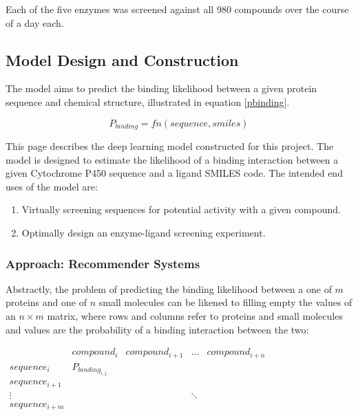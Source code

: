 \documentclass[16pt]{book}
\begin{document}
Each of the five enzymes was screened against all 980 compounds over the course of a day each.




\subsection{Model Design and Construction}

The model aims to predict the binding likelihood between a given protein sequence and chemical structure, illustrated in equation \ref{pbinding}.


\label{pbinding}
\begin{equation}
P_{binding} = fn(sequence, smiles)
\end{equation}


This page describes the deep learning model constructed for this project.
The model is designed to estimate the likelihood of a binding interaction between a given Cytochrome P450 sequence and a ligand SMILES code.
The intended end uses of the model are:

\begin{enumerate}
	\item Virtually screening sequences for potential activity with a given compound.
	\item Optimally design an enzyme-ligand screening experiment.
\end{enumerate}


\subsubsection{Approach: Recommender Systems}

Abstractly, the problem of predicting the binding likelihood between a one of $m$ proteins and one of $n$ small molecules can be likened to filling empty the values of an $n \times m$ matrix, where rows and columns refer to proteins and small molecules and values are the probability of a binding interaction between the two:

\begin{center}
$
\begin{matrix} 
	 & compound_i & compound_{i+1} & ... & compound_{i+n} \\
	sequence_i  & P_{binding_{i,j}} &  &  & \\  
	sequence_{i+1} &  &  &  &  \\
	 \vdots &  &  & \ddots &  \\
	sequence_{i+m} &  &  &  &   \\
\end{matrix}
$
\end{center}
\end{document}
